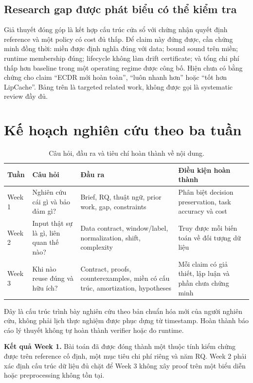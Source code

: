 \documentclass[11pt,a4paper]{article}
\theoremstyle{remark}
\begin{document}
\subsection{Research gap được phát biểu có thể kiểm tra}
Giả thuyết đóng góp là kết hợp cấu trúc cửa sổ với chứng nhận quyết định
reference và một policy có cost đủ thấp. Để claim này đứng được, cần chứng
minh đồng thời: miền được định nghĩa đúng với data; bound sound trên miền;
runtime membership đúng; lifecycle không làm drift certificate; và tổng
chi phí thấp hơn baseline trong một operating regime được công bố.
Hiện chưa có bằng chứng cho claim ``ECDR mới hoàn toàn'', ``luôn nhanh hơn''
hoặc ``tốt hơn LipCache''. Bảng trên là targeted related work, không được
gọi là systematic review đầy đủ.

\section{Kế hoạch nghiên cứu theo ba tuần}
\begin{table}[htbp]\centering
\caption{Câu hỏi, đầu ra và tiêu chí hoàn thành về nội dung.}
\begin{tabularx}{\linewidth}{@{}p{1.35cm}YYY@{}}\toprule
Tuần & Câu hỏi & Đầu ra & Điều kiện hoàn thành\\\midrule
Week 1 & Nghiên cứu cái gì và bảo đảm gì? & Brief, RQ, thuật ngữ, prior work,
gap, constraints & Phân biệt decision preservation, task accuracy và cost\\
Week 2 & Input thật sự là gì, liên quan thế nào? & Data contract, window/label,
normalization, shift, complexity & Truy được mỗi biến toán về đối tượng dữ liệu\\
Week 3 & Khi nào reuse đúng và hữu ích? & Contract, proofs, counterexamples,
miền có cấu trúc, amortization, hypotheses & Mỗi claim có giả thiết, lập luận
và phần chưa chứng minh\\\bottomrule
\end{tabularx}
\end{table}
Đây là cấu trúc trình bày nghiên cứu theo bản chuẩn hóa mới của người nghiên
cứu, không phải lịch thực nghiệm được phục dựng từ timestamp. Hoàn thành
báo cáo lý thuyết không tự hoàn thành verifier hoặc đo runtime.

\textbf{Kết quả Week 1.} Bài toán đã được đóng thành một thuộc tính kiểm
chứng được trên reference cố định, một mục tiêu chi phí riêng và năm RQ.
Week 2 phải xác định cấu trúc dữ liệu đủ chặt để Week 3 không xây proof trên
một biểu diễn hoặc preprocessing không tồn tại.
\end{document}
